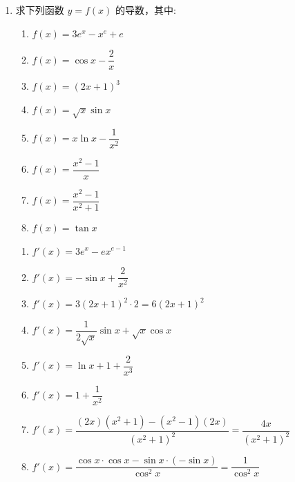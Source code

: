 \begin{enumerate}
    \item 求下列函数 $y = f\left( x\right)$ 的导数，其中:
    \begin{enumerate}
        \item $f\left( x\right)  = 3{e}^{x} - {x}^{e} + e$
        \item $f\left( x\right)  = \cos x - \dfrac{2}{x}$
        \item $f\left( x\right)  = {\left( 2x + 1\right) }^{3}$
        \item $f\left( x\right)  = \sqrt{x}\sin x$
        \item $f\left( x\right)  = x\ln x - \dfrac{1}{{x}^{2}}$
        \item $f\left( x\right)  = \dfrac{{x}^{2} - 1}{x}$
        \item $f\left( x\right)  = \dfrac{{x}^{2} - 1}{{x}^{2} + 1}$
        \item $f\left( x\right)  = \tan x$
    \end{enumerate}
    \begin{jieda}
        \begin{enumerate}
            \item $f'(x) = 3e^x - e x^{e-1}$
        
            \item $f'(x) = -\sin x + \dfrac{2}{x^2}$
        
            \item $f'(x) = 3(2x+1)^2 \cdot 2 = 6(2x+1)^2$
        
            \item $f'(x) = \dfrac{1}{2\sqrt{x}}\sin x + \sqrt{x}\cos x$
        
            \item $f'(x) = \ln x + 1 + \dfrac{2}{x^3}$
        
            \item $f'(x) = 1 + \dfrac{1}{x^2}$
        
            \item $f'(x) = \dfrac{(2x)(x^2+1) - (x^2-1)(2x)}{(x^2+1)^2} = \dfrac{4x}{(x^2+1)^2}$
        
            \item $f'(x) = \dfrac{\cos x \cdot \cos x - \sin x \cdot (-\sin x)}{\cos^2 x} = \dfrac{1}{\cos^2 x}$
        \end{enumerate}
    \end{jieda}
    

\end{enumerate}
